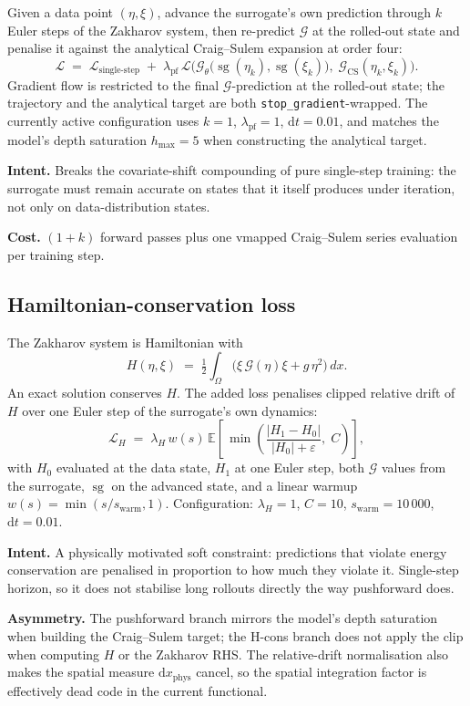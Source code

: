\documentclass[11pt,letterpaper]{article}
\newcommand{\Gop}{\mathcal{G}}
\newcommand{\sgrad}{\operatorname{sg}}
\begin{document}
Given a data point $(\eta,\xi)$, advance the surrogate's own prediction
through $k$ Euler steps of the Zakharov system, then re-predict
$\Gop$ at the rolled-out state and penalise it against the analytical
Craig--Sulem expansion at order four:
\[
  \mathcal{L} \;=\; \mathcal{L}_{\text{single-step}}
  \;+\; \lambda_{\mathrm{pf}}\,\mathcal{L}\!\bigl(
        \Gop_\theta\!\bigl(\sgrad(\eta_k),\sgrad(\xi_k)\bigr),\;
        \Gop_{\text{CS}}(\eta_k,\xi_k)
        \bigr).
\]
Gradient flow is restricted to the final $\Gop$-prediction at the
rolled-out state; the trajectory and the analytical target are both
\texttt{stop\_gradient}-wrapped. The currently active configuration uses
$k=1$, $\lambda_{\mathrm{pf}}=1$, $\mathrm{d}t=0.01$, and matches the
model's depth saturation $h_{\max}=5$ when constructing the analytical
target.

\textbf{Intent.} Breaks the covariate-shift compounding of pure
single-step training: the surrogate must remain accurate on states that
it itself produces under iteration, not only on data-distribution states.

\textbf{Cost.} $(1+k)$ forward passes plus one vmapped Craig--Sulem
series evaluation per training step.

\subsection{Hamiltonian-conservation loss}
\label{ssec:hcons}

The Zakharov system is Hamiltonian with
\[
  H(\eta,\xi) \;=\; \tfrac{1}{2}\!\int_\Omega
    \bigl(\xi\,\Gop(\eta)\xi + g\,\eta^{2}\bigr)\,dx.
\]
An exact solution conserves $H$. The added loss penalises clipped
relative drift of $H$ over one Euler step of the surrogate's own
dynamics:
\[
  \mathcal{L}_H \;=\; \lambda_H\,
    w(s)\,\mathbb{E}\!\left[\,\min\!\left(
      \frac{|H_1 - H_0|}{|H_0|+\varepsilon},\;C\right)\right],
\]
with $H_0$ evaluated at the data state, $H_1$ at one Euler step, both
$\Gop$ values from the surrogate, $\sgrad$ on the advanced state, and a
linear warmup $w(s)=\min(s/s_{\mathrm{warm}},1)$. Configuration:
$\lambda_H=1$, $C=10$, $s_{\mathrm{warm}}=10\,000$,
$\mathrm{d}t=0.01$.

\textbf{Intent.} A physically motivated soft constraint: predictions
that violate energy conservation are penalised in proportion to how much
they violate it. Single-step horizon, so it does not stabilise long
rollouts directly the way pushforward does.

\textbf{Asymmetry.} The pushforward branch mirrors the model's
depth saturation when building the Craig--Sulem target; the H-cons
branch does not apply the clip when computing $H$ or the Zakharov RHS.
The relative-drift normalisation also makes the spatial measure
$\mathrm{d}x_{\mathrm{phys}}$ cancel, so the spatial integration factor
is effectively dead code in the current functional.
\end{document}
